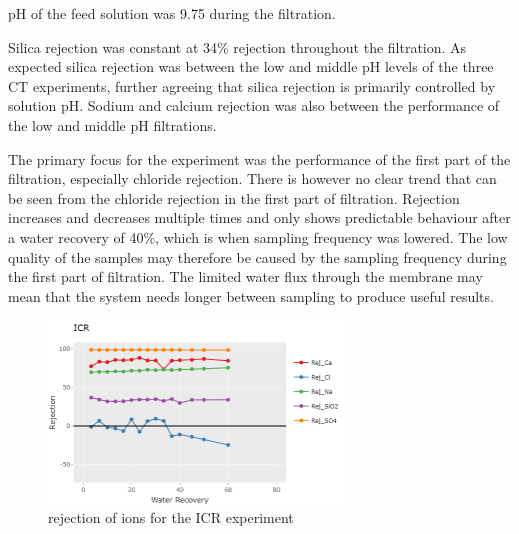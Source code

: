 pH of the feed solution was 9.75 during the filtration.

Silica rejection was constant at 34\% rejection throughout the filtration.
As expected silica rejection was between the low and middle pH levels of the three CT experiments, further agreeing that silica rejection is primarily controlled by solution pH.
Sodium and calcium rejection was also between the performance of the low and middle pH filtrations.

The primary focus for the experiment was the  performance of the first part of the filtration, especially chloride rejection.
There is however no clear trend that can be seen from the chloride rejection in the first part of filtration.
Rejection increases and decreases multiple times and only shows predictable behaviour after a water recovery of 40\%, which is when sampling frequency was lowered.
The low quality of the samples may therefore be caused by the sampling frequency during the first part of filtration.
The limited water flux through the membrane may mean that the system needs longer between sampling to produce useful results.

\begin{figure}[H]
    \centering
    \includegraphics[width=0.7\textwidth]{Billeder/data/multi_salt/ICR_1_rejection.png}
    \caption{rejection of ions for the ICR experiment}
    \label{fig:my_ICR_rejection}
\end{figure}



















